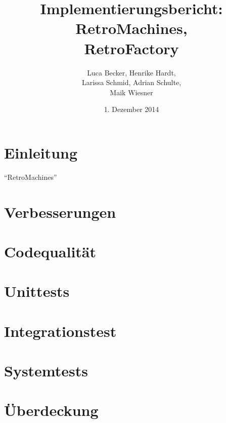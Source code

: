\documentclass[parskip=full]{scrreprt}
\begin{document}
\title{Implementierungsbericht: RetroMachines, \\ RetroFactory}
\author{Luca Becker, Henrike Hardt,\\Larissa Schmid, Adrian Schulte,\\Maik Wiesner}
\date{1. Dezember 2014}
\maketitle
\thispagestyle{empty}

\clearpage

\thispagestyle{empty}
\tableofcontents
\thispagestyle{empty}

\clearpage
\setcounter{page}{1}

\chapter{Einleitung}

\enquote{RetroMachines}

\chapter{Verbesserungen}

\chapter{Codequalität}

\chapter{Unittests}

\chapter{Integrationstest}

\chapter{Systemtests}

\chapter{Überdeckung}
\end{document}
